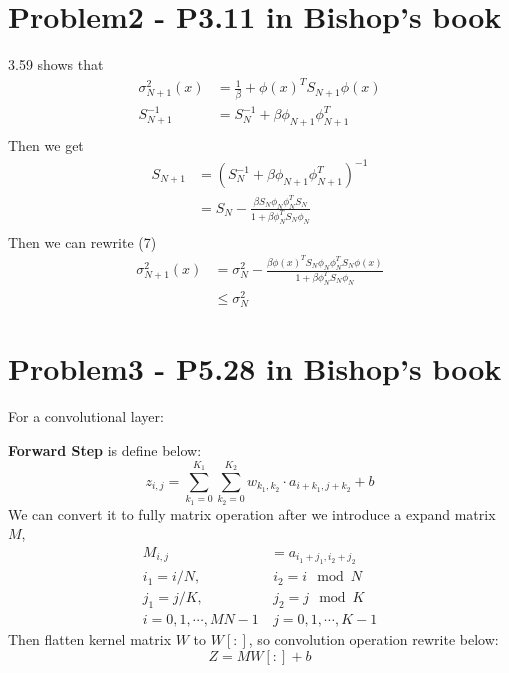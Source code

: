 \documentclass[12pt]{article}
\begin{document}
\section{Problem2 - P3.11 in Bishop's book}
3.59 shows that
\begin{equation}
	\begin{split}
	\sigma_{N+1}^2(x) &= \frac{1}{\beta} + \phi(x)^T S_{N+1} \phi(x)\\
	S_{N+1}^{-1} &= S_N^{-1} + \beta \phi_{N+1} \phi_{N+1}^T\\
	\end{split}
\end{equation}
Then we get
\begin{equation}
	\begin{split}
		S_{N+1} &= (S_N^{-1} + \beta \phi_{N+1} \phi_{N+1}^T)^{-1}\\
		&= S_N - \frac{\beta S_N \phi_N \phi_N^T S_N}{1+\beta \phi_N^T S_N \phi_N}\\
	\end{split}
\end{equation}
Then we can rewrite (7)
\begin{equation}
	\begin{split}
		\sigma_{N+1}^2(x) &= \sigma_N^2 - \frac{\beta \phi(x)^T S_N \phi_N \phi_N^T S_N \phi(x)}{1+\beta \phi_N^T S_N \phi_N}\\
		&\leq \sigma_N^2
	\end{split}
\end{equation}

\section{Problem3 - P5.28 in Bishop's book}
For a convolutional layer:

\textbf{Forward Step} is define below:
\begin{equation}
	z_{i,j} = \sum_{k_1=0}^{K_1} \sum_{k_2=0}^{K_2} w_{k_1, k_2} \cdot a_{i+k_1, j+k_2} + b
\end{equation}
We can convert it to fully matrix operation after we introduce a expand matrix $M$,
\begin{equation}
	\begin{split}
		M_{i,j} &= a_{i_1+j_1,i_2+j_2}\\
		i_1 = i / N,&\ i_2 = i \mod N\\
		j_1 = j / K,&\ j_2 = j \mod K\\
		i = 0, 1, \cdots, MN-1&\ j = 0, 1, \cdots, K-1
	\end{split}
\end{equation}
Then flatten kernel matrix $W$ to $W[:]$, so convolution operation rewrite below:
\begin{equation}
	Z = MW[:] + b
\end{equation}
\end{document}
